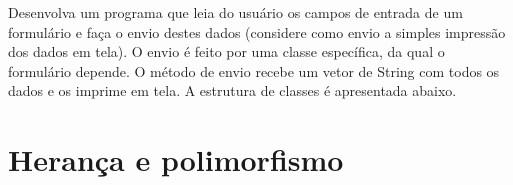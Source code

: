 \begin{exercise}[EnvioFormulario]
Desenvolva um programa que leia do usuário os campos de entrada de um formulário e faça o envio destes dados (considere como envio a simples impressão dos dados em tela). O envio é feito por uma classe específica, da qual o formulário depende. O método de envio recebe um vetor de String com todos os dados e os imprime em tela. A estrutura de classes é apresentada abaixo.

\begin{figure}[h]
	\centering
\end{figure}

\end{exercise}

\clearpage

\section{Herança e polimorfismo}

